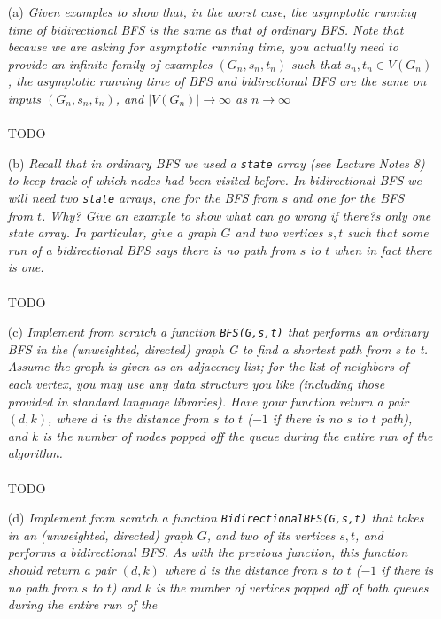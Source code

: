 \documentclass[12pt]{article} \setlength{\oddsidemargin}{0in}
\begin{document}
\begin{enumerate}
\item[(a)]{\textit{Given examples to show that, in the worst case, the asymptotic running time of
bidirectional BFS is the same as that of ordinary BFS. Note that because we are
asking for asymptotic running time, you actually need to provide an infinite family
of examples $(G_n , s_n , t_n )$ such that $s_n, t_n \in V(G_n)$, the asymptotic running time of
BFS and bidirectional BFS are the same on inputs $(G_n, s_n, t_n)$, and $|V(G_n)| \rightarrow \infty$ as $n \rightarrow \infty$}}
  \\\\
  TODO
  \\
\item[(b)]{\textit{Recall that in ordinary BFS we used a \texttt{state} array (see Lecture Notes 8) to keep track of which nodes had been visited before. In bidirectional BFS we will need two
\texttt{state} arrays, one for the BFS from $s$ and one for the BFS from $t$. Why? Give an
example to show what can go wrong if there?s only one state array. In particular,
give a graph $G$ and two vertices $s, t$ such that some run of a bidirectional BFS
says there is no path from $s$ to $t$ when in fact there is one.}}
  \\\\
  TODO
  \\
  \item[(c)]{\textit{Implement from scratch a function \texttt{BFS(G,s,t)} that performs an ordinary BFS in the (unweighted, directed) graph G to find a shortest path from s to t. Assume
the graph is given as an adjacency list; for the list of neighbors of each vertex,
you may use any data structure you like (including those provided in standard
language libraries). Have your function return a pair $(d, k)$, where $d$ is the distance
from $s$ to $t$ ($-1$ if there is no $s$ to $t$ path), and $k$ is the number of nodes popped
off the queue during the entire run of the algorithm.}}
  \\\\
  TODO
  \\
\item[(d)]{\textit{Implement from scratch a function \texttt{BidirectionalBFS(G,s,t)} that takes in an (unweighted, directed) graph $G$, and two of its vertices $s,t$, and performs a bidirectional BFS. As with the previous function, this function should return a pair
$(d, k)$ where $d$ is the distance from $s$ to $t$ ($-1$ if there is no path from $s$ to $t$) and $k$ is the number of vertices popped off of both queues during the entire run of the
}}
\end{enumerate}
\end{document}
